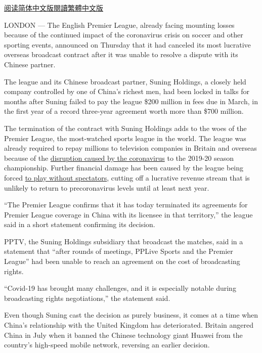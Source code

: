 \href{https://cn.nytimes3xbfgragh.onion/sports/20200904/premier-league-china-contract-television/}{阅读简体中文版}\href{https://cn.nytimes3xbfgragh.onion/sports/20200904/premier-league-china-contract-television/zh-hant/}{閱讀繁體中文版}

LONDON --- The English Premier League, already facing mounting losses
because of the continued impact of the coronavirus crisis on soccer and
other sporting events, announced on Thursday that it had canceled its
most lucrative overseas broadcast contract after it was unable to
resolve a dispute with its Chinese partner.

The league and its Chinese broadcast partner, Suning Holdings, a closely
held company controlled by one of China's richest men, had been locked
in talks for months after Suning failed to pay the league \$200 million
in fees due in March, in the first year of a record three-year agreement
worth more than \$700 million.

The termination of the contract with Suning Holdings adds to the woes of
the Premier League, the most-watched sports league in the world. The
league was already required to repay millions to television companies in
Britain and overseas because of the
\href{https://www.nytimes3xbfgragh.onion/2020/07/26/sports/soccer/premier-league-decision-day.html}{disruption
caused by the coronavirus} to the 2019-20 season championship. Further
financial damage has been caused by the league being forced
\href{https://www.nytimes3xbfgragh.onion/2020/06/19/sports/soccer/premier-league-tottenham-manchester-united.html}{to
play without spectators}, cutting off a lucrative revenue stream that is
unlikely to return to precoronavirus levels until at least next year.

``The Premier League confirms that it has today terminated its
agreements for Premier League coverage in China with its licensee in
that territory,'' the league said in a short statement confirming its
decision.

PPTV, the Suning Holdings subsidiary that broadcast the matches, said in
a statement that ``after rounds of meetings, PPLive Sports and the
Premier League'' had been unable to reach an agreement on the cost of
broadcasting rights.

``Covid-19 has brought many challenges, and it is especially notable
during broadcasting rights negotiations,'' the statement said.

Even though Suning cast the decision as purely business, it comes at a
time when China's relationship with the United Kingdom has deteriorated.
Britain angered China in July when it banned the Chinese technology
giant Huawei from the country's high-speed mobile network, reversing an
earlier decision.

